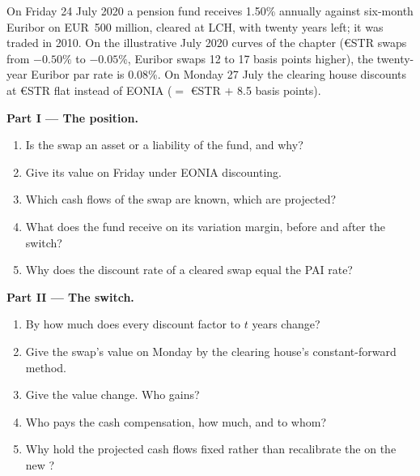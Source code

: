 \begin{problem}\label{pb:rc:multi-curve-and-collateral-discounting:1}
On Friday 24 July 2020 a pension fund receives 1.50\% annually against
six-month Euribor on EUR~500 million, cleared at LCH, with twenty years left;
it was traded in 2010. On the illustrative July 2020 curves of the chapter
(€STR swaps from $-0.50\%$ to $-0.05\%$, Euribor swaps 12 to 17 basis points
higher), the twenty-year Euribor par rate is 0.08\%. On Monday 27 July the
clearing house discounts at €STR flat instead of EONIA ($=$ €STR $+$ 8.5
basis points).

\medskip\noindent\textbf{Part I --- The position.}
\begin{enumerate}
\item Is the swap an asset or a liability of the fund, and why?
\item Give its value on Friday under EONIA discounting.
\item Which cash flows of the swap are known, which are projected?
\item What does the fund receive on its variation margin, before and after the switch?
\item Why does the discount rate of a cleared swap equal the PAI rate?
\end{enumerate}

\medskip\noindent\textbf{Part II --- The switch.}
\begin{enumerate}[resume]
\item By how much does every discount factor to $t$ years change?
\item Give the swap's value on Monday by the clearing house's constant-forward method.
\item Give the value change. Who gains?
\item Who pays the cash compensation, how much, and to whom?
\item Why hold the projected cash flows fixed rather than recalibrate the
 on the new ?
\end{enumerate}


\end{problem}
